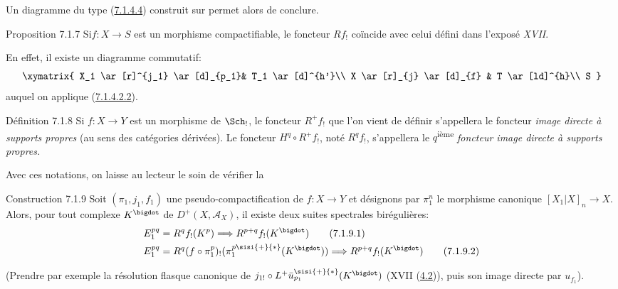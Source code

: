 Un diagramme du type (\hyperref[XVII.par7.1.4.4]{7.1.4.4}) construit sur
 permet alors de conclure.

\begin{enonce*}{Proposition 7.1.7}
Si\pageoriginale $f:X\rightarrow S$ est un morphisme compactifiable,
le foncteur $Rf_{!}$ coïncide avec celui défini dans l'exposé \emph{XVII}.
\end{enonce*}

En effet, il existe un diagramme commutatif:
\[
\xymatrix{
X_1         \ar[r]^{j_1} \ar[d]_{p_1}& T_1 \ar[d]^{h'}\\
X           \ar[r]_{j}  \ar[d]_{f} & T \ar[ld]^{h}\\
S
}
\]
auquel on applique (\hyperref[XVII.lem7.1.4.2.2]{7.1.4.2.2}).

\begin{enonce*}{Définition 7.1.8}
Si $f:X\rightarrow Y$ est un morphisme de $\Sch_{!}$, le foncteur
$R^{+}f_{!}$ que l'on vient de définir s'appellera le foncteur \emph{image
directe à supports propres} (au sens des catégories dérivées). Le
foncteur $H^{q}\circ R^{+}f_{!}$, noté $R^{q}f_{!}$, s'appellera le
$q$\textsuperscript{ième} \emph{foncteur image directe à supports propres.}
\end{enonce*}

Avec ces notations, on laisse au lecteur le soin de vérifier la

\begin{enonce*}{Construction 7.1.9}
Soit $(\pi_{1}, j_{1}, f_{1})$ une pseudo-compactification de
$f:X\rightarrow Y$ et désignons par $\pi^{n}_{1}$ le morphisme
canonique $[X_{1}|X]_{n}\rightarrow X$. Alors, pour tout complexe
$K^{\bigdot}$ de $D^{+}(X,\mathcal{A}_{X})$, il existe deux suites
spectrales birégulières:
\begin{align*}
E^{pq}_{1} &= R^{q}f_{!}(K^{p})\Longrightarrow R^{p+q}
f_{!}(K^{\bigdot})\tag{7.1.9.1}\\
E^{pq}_{1} &= R^{q}(f\circ
\pi^{p}_{1})_{!}(\pi^{p\sisi{+}{*}}_{1}(K^{\bigdot}))\Longrightarrow
R^{p+q}f_{!}(K^{\bigdot})\tag{7.1.9.2}
\end{align*}
\end{enonce*}

(Prendre par exemple la résolution flasque canonique de $j_{1!}\circ
L^{+}\bar{u}_{p_{1}}^{\sisi{+}{*}}(K^{\bigdot})$ (\cf XVII (\hyperref[XVII.subsec4.2]{4.2})), puis son
image directe par $u_{f_{1}}$).

